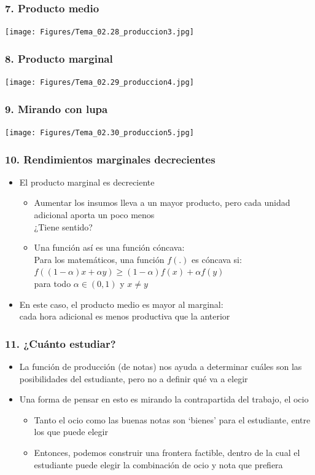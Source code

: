\documentclass[14pt]{beamer}
\begin{document}
\begin{frame}
\frametitle{7. Producto medio}
\centering
\texttt{[image: Figures/Tema\_02.28\_produccion3.jpg]}
\end{frame}

\begin{frame}
\frametitle{8. Producto marginal}
\centering
\texttt{[image: Figures/Tema\_02.29\_produccion4.jpg]}
\end{frame}

\begin{frame}
\frametitle{9. Mirando con lupa}
\centering
\texttt{[image: Figures/Tema\_02.30\_produccion5.jpg]}
\end{frame}

\begin{frame}
\frametitle{10. Rendimientos marginales decrecientes}
\begin{itemize}
    \item El producto marginal es decreciente
        \begin{itemize}
            \item Aumentar los insumos lleva a un mayor producto, pero cada unidad adicional aporta un poco menos \\
            ¿Tiene sentido?
            \item Una función así es una función cóncava: \\
            Para los matemáticos, una función $f(.)$ es cóncava si: \\
$f((1-\alpha)x+\alpha y) \geq (1-\alpha) f(x)+\alpha f(y) $ \\ para todo $\alpha \in (0,1)$ y $x \neq y$ 
        \end{itemize}
    \item En este caso, el producto medio es mayor al marginal: \\
    cada hora adicional es menos productiva que la anterior
\end{itemize} 
\end{frame}

\begin{frame}
\frametitle{11. ¿Cuánto estudiar?}
\begin{itemize}
    \item La función de producción (de notas) nos ayuda a determinar cuáles son las posibilidades del estudiante, pero no a definir qué va a elegir \\ \vspace{3mm}
    \item Una forma de pensar en esto es mirando la contrapartida del trabajo, el ocio
        \begin{itemize}
        \item Tanto el ocio como las buenas notas son ‘bienes’ para el estudiante, entre los que puede elegir
        \item Entonces, podemos construir una frontera factible, dentro de la cual el estudiante puede elegir la combinación de ocio y nota que prefiera
        \end{itemize}
\end{itemize} 
\end{frame}
\end{document}
